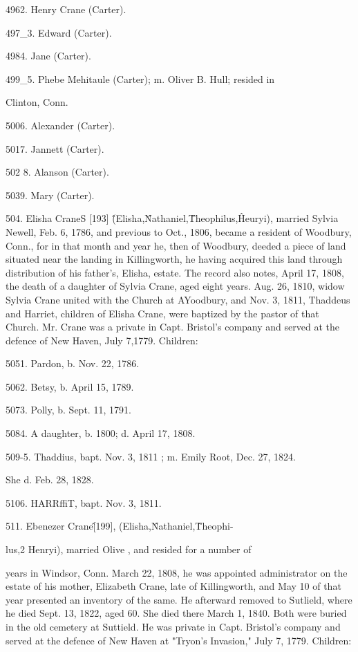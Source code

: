 \documentclass{book}
\begin{document}
4962. Henry Crane (Carter). 

497\_3. Edward (Carter). 

4984. Jane (Carter). 

499\_5. Phebe Mehitaule (Carter); m. Oliver B. Hull; resided in 

Clinton, Conn. 

5006. Alexander (Carter). 

5017. Jannett (Carter). 

502  8. Alanson (Carter). 

5039. Mary (Carter). 

504. Elisha CraneS [193] \^ (Elisha,\^ Nathaniel,\^ Theophilus,\^ 
Heuryi), married Sylvia Newell, Feb. 6, 1786, and previous to 
Oct., 1806, became a resident of Woodbury, Conn., for in that 
month and year he, then of Woodbury, deeded a piece of land 
situated near the landing in Killingworth, he having acquired 
this land through distribution of his father's, Elisha, estate. The 
record also notes, April 17, 1808, the death of a daughter of 
Sylvia Crane, aged eight years. Aug. 26, 1810, widow Sylvia 
Crane united with the Church at AYoodbury, and Nov. 3, 1811, 
Thaddeus and Harriet, children of Elisha Crane, were baptized 
by the pastor of that Church. Mr. Crane was a private in Capt. 
Bristol's company and served at the defence of New Haven, July 
7,1779. Children: 

5051. Pardon, b. Nov. 22, 1786. 

5062. Betsy, b. April 15, 1789. 

5073. Polly, b. Sept. 11, 1791. 

5084. A daughter, b. 1800; d. April 17, 1808. 

509-5. Thaddius, bapt. Nov. 3, 1811 ; m. Emily Root, Dec. 27, 1824. 

She d. Feb. 28, 1828. 

5106. HARRffiT, bapt. Nov. 3, 1811. 

511. Ebenezer Crane\^ [199], (Elisha,\^ Nathaniel,\^ Theophi- 

lus,2 Henryi), married Olive , and resided for a number of 

years in Windsor, Conn. March 22, 1808, he was appointed 
administrator on the estate of his mother, Elizabeth Crane, late 
of Killingworth, and May 10 of that year presented an inventory 
of the same. He afterward removed to Sutlield, where he died 
Sept. 13, 1822, aged 60. She died there March 1, 1840. Both 
were buried in the old cemetery at Suttield. He was private in 
Capt. Bristol's company and served at the defence of New Haven 
at "Tryon's Invasion," July 7, 1779. Children: 
\end{document}
